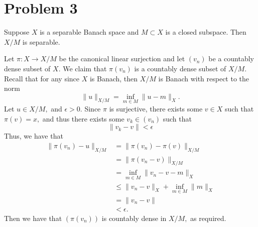 \documentclass[11pt]{article}
\begin{document}
\section*{Problem 3}
\begin{problem}
    Suppose $X$ is a separable Banach space and $M\subset X$ is a closed subspace. Then $X/M$ is separable.
\end{problem}
\begin{solution}
    Let $\pi: X\to X/M$ be the canonical linear surjection and let $(v_n)$ be a countably dense subset of $X.$ We claim that $\pi(v_n)$ is a countably dense subset of $X/M.$ Recall that for any since $X$ is Banach, then $X/M$ is Banach with respect to the norm
    \[\|u\|_{X/M} = \inf_{m\in M}\|u - m\|_X.\] Let $u \in X/M,$ and $\epsilon>0.$ Since $\pi$ is surjective, there exists some $v\in X$ such that $\pi(v) = x,$ and thus there exists some $v_k \in (v_n)$ such that 
    \[\|v_k - v\|< \epsilon\] 
    Thus, we have that 
    \begin{align*}
        \|\pi(v_n) - u\|_{X/M} &= \|\pi(v_n) - \pi(v)\|_{X/M}\\ 
        &=\|\pi(v_n  - v)\|_{X/M}\\
        &= \inf_{m\in M} \|v_n - v - m\|_X\\
        &\leq \|v_n - v\|_X + \inf_{m\in M}\|m\|_X\\
        &= \|v_n - v\|\\
        &< \epsilon.
    \end{align*}
Then we have that $(\pi(v_n))$ is countably dense in $X/M,$ as required.
\end{solution}

\newpage
\end{document}
